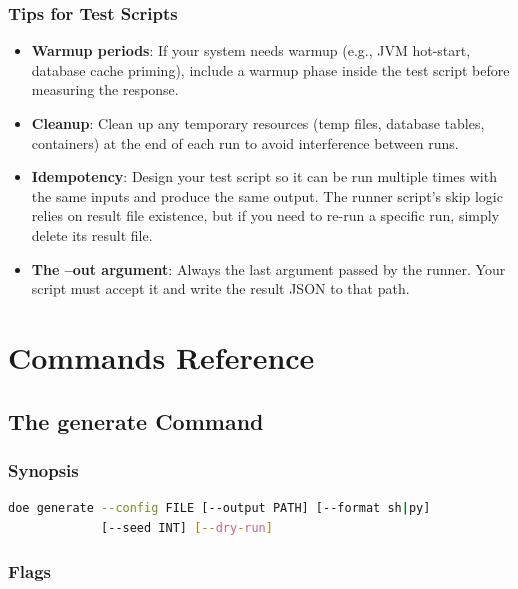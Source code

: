\documentclass[11pt]{book}
\begin{document}
\section{Tips for Test Scripts}

\begin{itemize}
  \item \textbf{Warmup periods}: If your system needs warmup (e.g., JVM hot-start, database cache priming), include a warmup phase inside the test script before measuring the response.
  \item \textbf{Cleanup}: Clean up any temporary resources (temp files, database tables, containers) at the end of each run to avoid interference between runs.
  \item \textbf{Idempotency}: Design your test script so it can be run multiple times with the same inputs and produce the same output. The runner script's skip logic relies on result file existence, but if you need to re-run a specific run, simply delete its result file.
  \item \textbf{The --out argument}: Always the last argument passed by the runner. Your script must accept it and write the result JSON to that path.
\end{itemize}


\part{Commands Reference}

\chapter{The generate Command}
\label{ch:generate}

\section{Synopsis}

\begin{lstlisting}[language=bash]
doe generate --config FILE [--output PATH] [--format sh|py]
             [--seed INT] [--dry-run]
\end{lstlisting}

\section{Flags}
\end{document}
